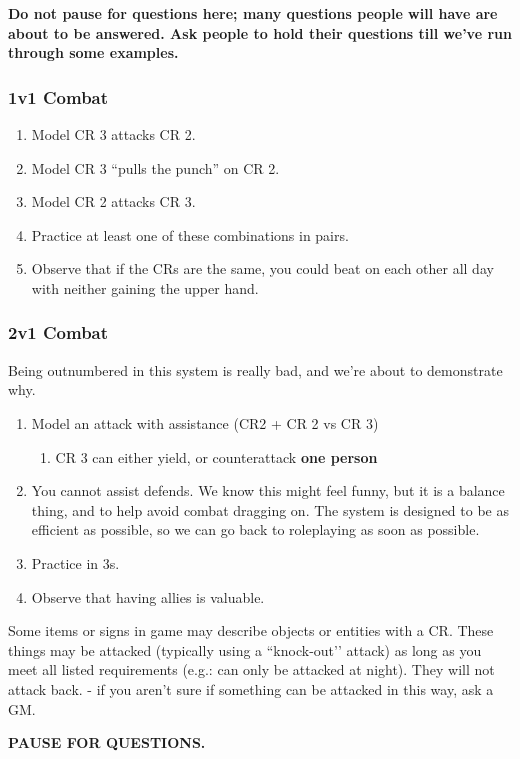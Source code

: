 \documentclass[green]{GL2020}
\begin{document}
\textbf{Do not pause for questions here; many questions people will have are about to be answered. Ask people to hold their questions till we've run through some examples.}

\subsubsection*{1v1 Combat}
\begin{enumerate}
	\item Model CR 3 attacks CR 2.
	\item Model CR 3 ``pulls the punch'' on CR 2.
	\item Model CR 2 attacks CR 3.
	\item Practice at least one of these combinations in pairs.
	\item Observe that if the CRs are the same, you could beat on each other all day with neither gaining the upper hand.
\end{enumerate}

\subsubsection*{2v1 Combat}
Being outnumbered in this system is really bad, and we're about to demonstrate why.
\begin{enumerate}
	\item Model an attack with assistance (CR2 + CR 2 vs CR 3)
	\begin{enumerate}
		\item CR 3 can either yield, or counterattack \textbf{one person}
	\end{enumerate}
	\item You cannot assist defends. We know this might feel funny, but it is a balance thing, and to help avoid combat dragging on. The system is designed to be as efficient as possible, so we can go back to roleplaying as soon as possible.
	\item Practice in 3s.
	\item Observe that having allies is valuable.
\end{enumerate}

Some items or signs in game may describe objects or entities with a CR. These things may be attacked (typically using a ``knock-out’’ attack) as long as you meet all listed requirements (e.g.: can only be attacked at night). They will not attack back. - if you aren’t sure if something can be attacked in this way, ask a GM.

\textbf{PAUSE FOR QUESTIONS.}
\end{document}
